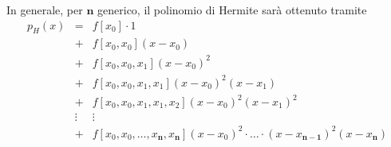 \begin{remark}
    In generale, per $\boldsymbol n$ generico, il polinomio di Hermite sarà ottenuto tramite 
    \begin{equation}\label{eq:polinomio_hermite_base_newton}
    	\begin{matrix}
    		p_H(x)&=& f[x_0]\cdot 1\\
    		&+& f[x_0,x_0](x-x_0)\\
    		&+& f[x_0,x_0,x_1](x-x_0)^2\\
    		&+& f[x_0,x_0,x_1,x_1](x-x_0)^2(x-x_1)\\
    		&+& f[x_0,x_0,x_1,x_1,x_2](x-x_0)^2(x-x_1)^2\\
    		&\vdots & \vdots\\
    		&+& f[x_0,x_0,\hdots,x_{\boldsymbol n},x_{\boldsymbol n}](x-x_0)^2\cdot\hdots\cdot(x-x_{\boldsymbol{n-1}})^2(x-x_{\boldsymbol n})
    	\end{matrix}
    \end{equation}
\end{remark}

